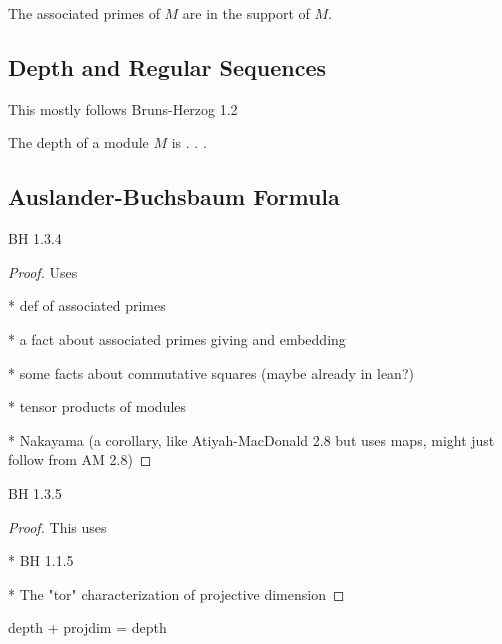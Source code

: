 \begin{proposition}
  \label{prop:assoc_primes_in_support}
  The associated primes of $M$ are in the
  support of $M$.
\end{proposition}

\subsection{Depth and Regular Sequences}

This mostly follows Bruns-Herzog 1.2

\begin{definition}
  \label{def:depth}
  The depth of a module $M$ is . . . 
\end{definition}


\subsection{Auslander-Buchsbaum Formula}

\begin{lemma}
  \label{lem:module_assoc_maximal_tensor_free_summand}
  BH 1.3.4
\end{lemma}

\begin{proof}
  Uses

  * def of associated primes

  * a fact about associated primes giving and embedding

  * some facts about commutative squares (maybe already in lean?)

  * tensor products of modules

  * Nakayama (a corollary, like Atiyah-MacDonald 2.8 
    but uses maps, might just follow from AM 2.8)
\end{proof}

\begin{lemma}
  \label{lem:projdim_preserved_quotient_reg_elt}
  BH 1.3.5
\end{lemma}

\begin{proof}
  This uses 

  * BH 1.1.5

  * The "tor" characterization of projective dimension

\end{proof}

\begin{theorem}
  \label{thm:auslander_buchsbaum_formula}
  depth + projdim = depth
\end{theorem}

